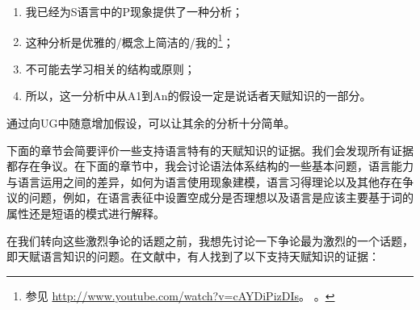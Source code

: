 \begin{enumerate}
\item 我已经为S语言中的P现象提供了一种分析；
\item 这种分析是优雅的/概念上简洁的/我的\footnote{%
    参见
    \url{http://www.youtube.com/watch?v=cAYDiPizDIs}。 。\nocite{Zappa86a}
}；
\item 不可能去学习相关的结构或原则；
\item 所以，这一分析中从A1到An的假设一定是说话者天赋知识的一部分。
\end{enumerate}
通过向UG中随意增加假设，可以让其余的分析十分简单。

下面的章节会简要评价一些支持语言特有的天赋知识的证据。我们会发现所有证据都存在争议。在下面的章节中，我会讨论语法体系结构的一些基本问题，语言能力与语言运用之间的差异，如何为语言使用现象建模，语言习得理论以及其他存在争议的问题，例如，在语言表征中设置空成分是否理想以及语言是应该主要基于词的属性还是短语的模式进行解释。

在我们转向这些激烈争论的话题之前，我想先讨论一下争论最为激烈的一个话题，即天赋语言知识的问题。在文献中，有人找到了以下支持天赋知识的证据：

